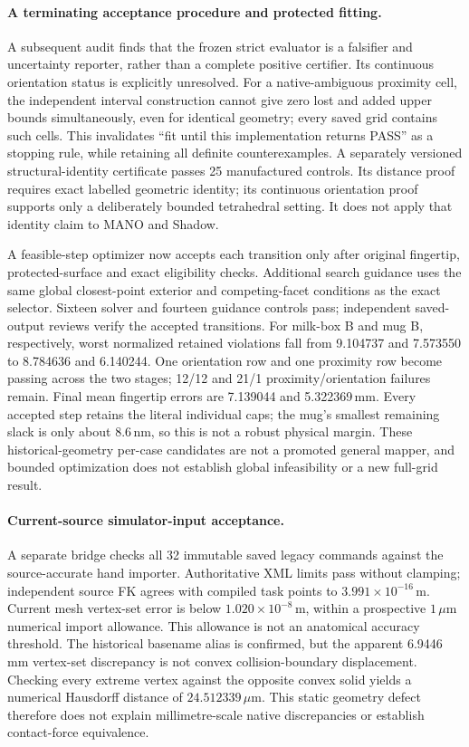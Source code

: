 \paragraph{A terminating acceptance procedure and protected fitting.}
A subsequent audit finds that the frozen strict evaluator is a falsifier and
uncertainty reporter, rather than a complete positive certifier. Its continuous
orientation status is explicitly unresolved. For a native-ambiguous proximity
cell, the independent interval construction cannot give zero lost and added
upper bounds simultaneously, even for identical geometry; every saved grid
contains such cells. This invalidates ``fit until this implementation returns
PASS'' as a stopping rule, while retaining all definite counterexamples.
A separately versioned structural-identity certificate passes 25 manufactured
controls. Its distance proof requires exact labelled geometric identity; its
continuous orientation proof supports only a deliberately bounded tetrahedral
setting. It does not apply that identity claim to MANO and Shadow.

A feasible-step optimizer now accepts each transition only after original
fingertip, protected-surface and exact eligibility checks. Additional search
guidance uses the same global closest-point exterior and competing-facet
conditions as the exact selector. Sixteen solver and fourteen guidance controls
pass; independent saved-output reviews verify the accepted transitions.
For milk-box B and mug B, respectively, worst normalized retained violations
fall from 9.104737 and 7.573550 to 8.784636 and 6.140244. One orientation row
and one proximity row become passing across the two stages; 12/12 and 21/1
proximity/orientation failures remain. Final mean fingertip errors are
7.139044 and 5.322369\,mm. Every accepted step retains the literal individual
caps; the mug's smallest remaining slack is only about 8.6\,nm, so this is not
a robust physical margin. These historical-geometry per-case candidates are
not a promoted general mapper, and bounded optimization does not establish
global infeasibility or a new full-grid result.

\paragraph{Current-source simulator-input acceptance.}
A separate bridge checks all 32 immutable saved legacy commands against the
source-accurate hand importer. Authoritative XML limits pass without clamping;
independent source FK agrees with compiled task points to
$3.991\times10^{-16}$\,m. Current mesh vertex-set error is below
$1.020\times10^{-8}$\,m, within a prospective $1\,\mu$m numerical import
allowance. This allowance is not an anatomical accuracy threshold.
The historical basename alias is confirmed, but the apparent 6.9446\,mm
vertex-set discrepancy is not convex collision-boundary displacement.
Checking every extreme vertex against the opposite convex solid yields a
numerical Hausdorff distance of $24.512339\,\mu$m. This static geometry defect
therefore does not explain millimetre-scale native discrepancies or establish
contact-force equivalence.

